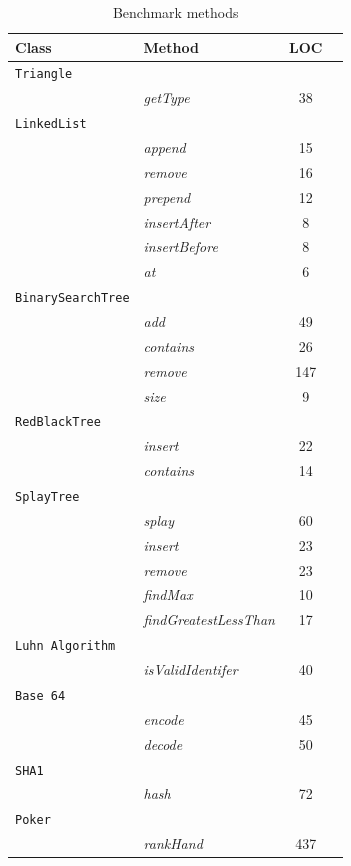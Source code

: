 \begin{table}[h]
\centering
\begin{tabular}{|l|l|c|c|}
\hline
\textbf{Class} & \textbf{Method} & \textbf{LOC} \\
\hline
\texttt{Triangle} & & \\
           & \textit{getType} & 38      \\
\hline
\texttt{LinkedList} & & \\
           & \textit{append} & 15       \\
           & \textit{remove} & 16       \\
           & \textit{prepend} & 12      \\
           & \textit{insertAfter} & 8   \\
           & \textit{insertBefore} & 8  \\
           & \textit{at} & 6            \\
\hline
\texttt{BinarySearchTree} & &     \\
           & \emph{add} & 49      \\
           & \emph{contains} & 26 \\
           & \emph{remove} & 147  \\
           & \emph{size} & 9      \\
\hline
\texttt{RedBlackTree} & &         \\
           & \emph{insert} & 22   \\
           & \emph{contains} & 14 \\
\hline
\texttt{SplayTree} & &             \\
           & \emph{splay} & 60 \\
           & \emph{insert} & 23 \\
           & \emph{remove} & 23 \\
           & \emph{findMax} & 10 \\
           & \emph{findGreatestLessThan} & 17 \\
\hline
\texttt{Luhn Algorithm} & &     \\
           & \emph{isValidIdentifer} & 40 \\
\hline
\texttt{Base 64} & &     \\
           & \emph{encode} & 45 \\
           & \emph{decode} & 50 \\
\hline
\texttt{SHA1} & &             \\
           & \emph{hash} & 72 \\
\hline
\texttt{Poker} & &                 \\
           & \emph{rankHand} & 437 \\
\hline
\end{tabular}
\caption{Benchmark methods}
\label{benchmarktests}
\end{table}

